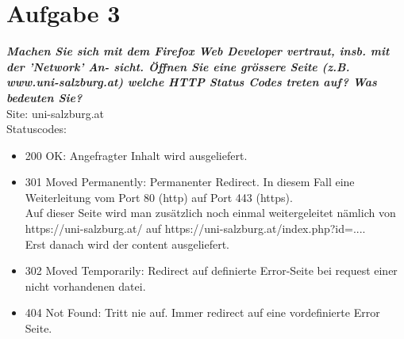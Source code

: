 \documentclass[12pt, a4paper]{report}
\begin{document}
\section*{Aufgabe 3}
\textbf{\textit{Machen Sie sich mit dem Firefox Web Developer vertraut, insb. mit der ’Network’ An-
sicht. Öffnen Sie eine grössere Seite (z.B. www.uni-salzburg.at) welche HTTP Status
Codes treten auf? Was bedeuten Sie?}}\\
Site: uni-salzburg.at\\
Statuscodes:
\begin{itemize}
	\item 200 OK: Angefragter Inhalt wird ausgeliefert.
	\item 301 Moved Permanently: Permanenter Redirect. In diesem Fall eine Weiterleitung vom Port 80 (http) auf Port 443 (https).\\
	Auf dieser Seite wird man zusätzlich noch einmal weitergeleitet nämlich von https://uni-salzburg.at/ auf https://uni-salzburg.at/index.php?id=....\\
	Erst danach wird der content ausgeliefert.
	\item 302 Moved Temporarily: Redirect auf definierte Error-Seite bei request einer nicht vorhandenen datei.
	\item 404 Not Found: Tritt nie auf. Immer redirect auf eine vordefinierte Error Seite.
\end{itemize}
\end{document}
